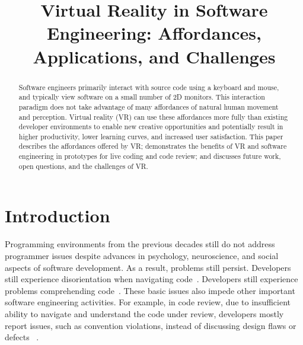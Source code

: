 \documentclass[conference]{IEEEtran}
\begin{document}
\title{Virtual Reality in Software Engineering: Affordances, Applications, and Challenges}

\author{
\and
{}
\and
{}
}

\maketitle
\begin{abstract}
Software engineers primarily interact with source code using a keyboard and mouse, and typically view software on a small number of 2D monitors.
This interaction paradigm does not take advantage of many affordances of natural human movement and perception.
Virtual reality (VR) can use these affordances more fully than existing developer environments to enable new creative opportunities and potentially result in higher productivity, lower learning curves, and increased user satisfaction.
This paper describes the affordances offered by VR; demonstrates the benefits of VR and software engineering in prototypes for live coding and code review; and discusses future work, open questions, and the challenges of VR.
\end{abstract}

\section{Introduction}

Programming environments from the previous decades still do not address programmer issues despite advances in psychology, neuroscience, and social aspects of software development.
As a result, problems still persist.  Developers still experience disorientation when navigating code~\cite{Henley:2014}.
Developers still experience problems comprehending code~\cite{Maalej:TOSEM:2014}.  These basic issues also impede other important software engineering activities. For example,
in code review, due to insufficient ability to navigate and understand the code under review, developers mostly report issues, such as convention violations, instead of discussing design flaws or defects
~\cite{bacchelli:ModernCodeReviewChallenges}.  
\end{document}
